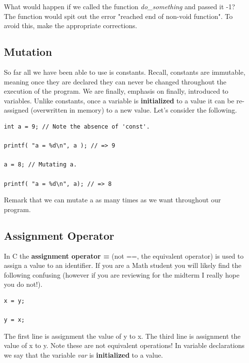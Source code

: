 \documentclass[12pt,extarticle]{article}
\begin{document}
What would happen if we called the function \emph{do\_something} and passed it -1? The function would spit out the error "reached end of non-void function". To avoid this, make the appropriate corrections.\\

\subsection{Mutation}

So far all we have been able to use is constants. Recall, constants are immutable, meaning once they are declared they can never be changed throughout the execution of the program. We are finally, emphasis on finally, introduced to variables. Unlike constants, once a variable is \textbf{initialized} to a value it can be re-assigned (overwritten in memory) to a new value. Let's consider the following.\\

\lstset {
	language=c
}
\begin{lstlisting}
int a = 9; // Note the absence of 'const'.

printf( "a = %d\n", a ); // => 9

a = 8; // Mutating a.

printf( "a = %d\n", a); // => 8
\end{lstlisting}

Remark that we can mutate a as many times as we want throughout our program.

\subsection{Assignment Operator}

In C the \textbf{assignment operator =} (not ==, the equivalent operator) is used to assign a value to an identifier. If you are a Math student you will likely find the following confusing (however if you are reviewing for the midterm I really hope you do not!).\\

\lstset {
	language=c
}
\begin{lstlisting}
x = y;

y = x;
\end{lstlisting}

The first line is assignment the value of y to x. The third line is assignment the value of x to y. Note these are not equivalent operations! In variable declarations we say that the variable \emph{var} is \textbf{initialized} to a value.\\
\end{document}
